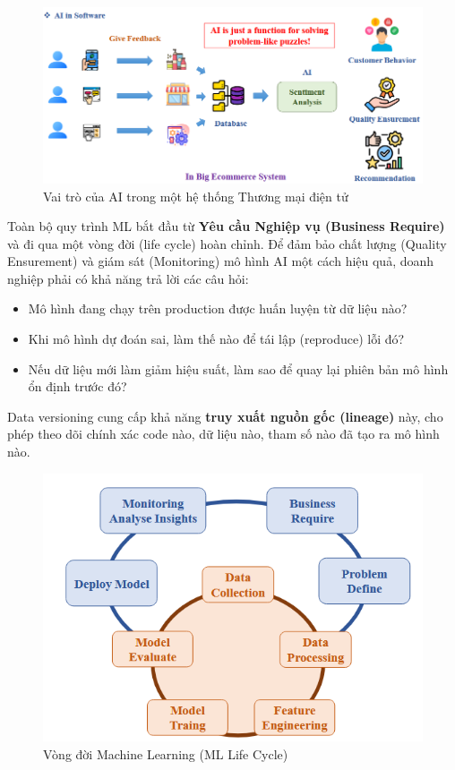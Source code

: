 \documentclass[11pt]{article}
\begin{document}
\begin{figure}[H]
    \centering
    \includegraphics[width=0.8\linewidth]{images/bs_pers.png}
    \caption{Vai trò của AI trong một hệ thống Thương mại điện tử}
\end{figure}

Toàn bộ quy trình ML bắt đầu từ \textbf{Yêu cầu Nghiệp vụ (Business Require)} và đi qua một vòng đời (life cycle) hoàn chỉnh. Để đảm bảo chất lượng (Quality Ensurement) và giám sát (Monitoring) mô hình AI một cách hiệu quả, doanh nghiệp phải có khả năng trả lời các câu hỏi:
\begin{itemize}
    \item Mô hình đang chạy trên production được huấn luyện từ dữ liệu nào?
    \item Khi mô hình dự đoán sai, làm thế nào để tái lập (reproduce) lỗi đó?
    \item Nếu dữ liệu mới làm giảm hiệu suất, làm sao để quay lại phiên bản mô hình ổn định trước đó?
\end{itemize}
Data versioning cung cấp khả năng \textbf{truy xuất nguồn gốc (lineage)} này, cho phép theo dõi chính xác code nào, dữ liệu nào, tham số nào đã tạo ra mô hình nào.

\begin{figure}[H]
    \centering
    \includegraphics[width=0.7\linewidth]{images/cv_lifecycle.png}
    \caption{Vòng đời Machine Learning (ML Life Cycle)}
\end{figure}
\end{document}
